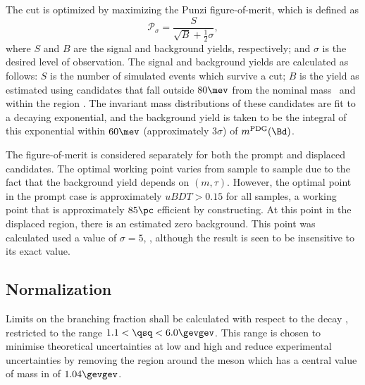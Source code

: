 
%

The \uBDT cut is optimized  by maximizing
the Punzi figure-of-merit, which is defined as
\begin{equation}
  \mathcal{P}_\sigma = \frac{S}{\sqrt{B} + \tfrac12\sigma},
  \label{eq:db:punzi}
\end{equation}
where $S$ and $B$ are the signal and background yields, respectively; and $\sigma$ is the desired
level of observation.
The signal and background yields are calculated as follows:
$S$ is the number of simulated events which survive a \uBDT cut;
$B$ is the yield as estimated using \btokstrdb candidates
that fall outside $80\mev$ from the nominal \Bd mass~\cite{PDG2014} and within the region .
The invariant mass distributions of these candidates are fit to a decaying exponential,
and the background yield is taken to be the integral of this exponential within $60\mev$
(approximately $3\sigma$) of $m^\mathrm{PDG}(\Bd)$.

The figure-of-merit is considered separately for both the prompt and displaced candidates.
The optimal working point varies from sample to sample due to the fact that the background yield
depends on $(m,\tau)$.
However, the optimal point in the prompt case is approximately $uBDT>0.15$ for all samples, a
working point that
is approximately $85\pc$ efficient by constructing.
At this point in the displaced region, there is an estimated zero background.
This point was calculated used a value of $\sigma=5$, , although the result is seen
to be insensitive to its exact value.



\subsection{Normalization}
Limits on the branching fraction shall be calculated with respect to the decay \btokstrmumu,
restricted to the range $1.1<\qsq<6.0\gevgev$.
This range is chosen to minimise theoretical uncertainties at low and high \qsq and reduce
experimental uncertainties by removing the region around the \phii meson which has a central value
of mass in \qsq of \approx$1.04\gevgev$.



